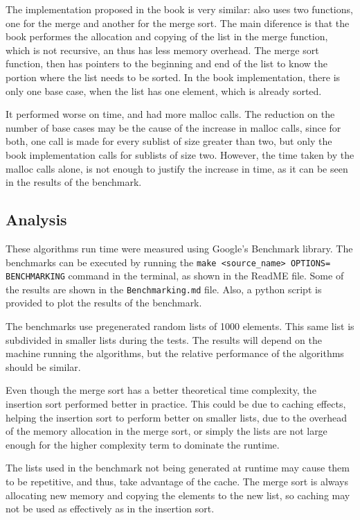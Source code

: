 \documentclass[a4paper,12pt,twocolumn]{article}
\begin{document}
The implementation proposed in the book is very similar:
also uses two functions, one for the merge and another for the merge sort.
The main diference is that the book performes the allocation and copying of the list in the merge function, which is not recursive, an thus has less memory overhead.
The merge sort function, then has pointers to the beginning and end of the list to know the portion where the list needs to be sorted.
In the book implementation, there is only one base case, when the list has one element, which is already sorted.

It performed worse on time, and had more malloc calls.
The reduction on the number of base cases may be the cause of the increase in malloc calls, since for both, one call is made for every sublist of size greater than two, but only the book implementation calls for sublists of size two. However, the time taken by the malloc calls alone, is not enough to justify the increase in time, as it can be seen in the results of the benchmark.

\subsection{Analysis}
\label{sec:benchmark}
These algorithms run time were measured using Google's Benchmark library.
The benchmarks can be executed by running the \verb|make <source_name> OPTIONS=| \verb|BENCHMARKING| command in the terminal,
as shown in the ReadME file.
Some of the results are shown in the \verb|Benchmarking.md| file.
Also, a python script is provided to plot the results of the benchmark.

The benchmarks use pregenerated random lists of 1000 elements.
This same list is subdivided in smaller lists during the tests.
The results will depend on the machine running the algorithms, but the relative performance of the algorithms should be similar.

Even though the merge sort has a better theoretical time complexity, the insertion sort performed better in practice.
This could be due to caching effects, helping the insertion sort to perform better on smaller lists,
due to the overhead of the memory allocation in the merge sort,
or simply the lists are not large enough for the higher complexity term to dominate the runtime.

The lists used in the benchmark not being generated at runtime may cause them to be repetitive, and thus, take advantage of the cache.
The merge sort is always allocating new memory and copying the elements to the new list, so caching may not be used as effectively as in the insertion sort.
\end{document}
